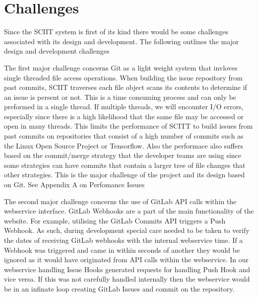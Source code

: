 \documentclass{mproj}
\begin{document}






\section{Challenges}

Since the SCIIT system is first of its kind there would be some challenges associated with its design and development. The following outlines the major design and development challenges

The first major challenge concerns Git as a light weight system that invloves single threaded file access operations. When building the issue repository from past commits, SCIIT traverses each file object scans its contents to determine if an issue is persent or not. This is a time consuming process and can only be preformed in a single thread. If multiple threads, we will encounter I/O errors, especially since there is a high likelihood that the same file may be accessed or open in many threads. This limits the performance of SCITT to build issues from past commits on repositories that consist of a high number of commits such as the Linux Open Source Project or Tensorflow. Also the performace also suffers based on the commit/merge strategy that the developer teams are using since some strategies can have commits that contain a larger tree of file changes that other strategies. This is the major challenge of the project and its design based on Git. See Appendix A on Perfomance Issues

The second major challenge concerns the use of GitLab API calls within the webservice interface. GitLab Webhooks are a part of the main functionality of the website. For example, utilising the GitLab Commits API triggers a Push Webhook. As such, during development special care needed to be taken to verify the dates of receiving GitLab webhooks with the internal webservice time. If a Webhook was triggered and came in within seconds of another they would be ignored as it would have originated from API calls within the webservice. In our webservice handling Issue Hooks generated requests for handling Push Hook and vice versa. If this was not carefully handled internally then the webservice would be in an infinate loop creating GitLab Issues and commit on the repository.
\end{document}
